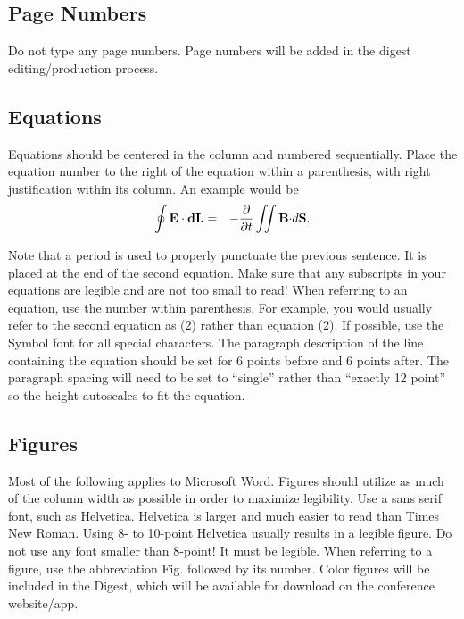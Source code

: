 \documentclass[]{IEEEtran}
\begin{document}
\subsection{Page Numbers }
Do not type any page numbers. Page numbers will be added in the digest editing/production process.
\subsection{Equations}
Equations should be centered in the column and numbered sequentially. Place the equation number to the right of the equation within a parenthesis, with right justification within its column. An example would be
\begin{eqnarray}
\oint {\bf E \cdot dL} & = & - {\partial\over \partial t}
\int\!\!\!\int {\bf B \cdot} d {\bf S}.
\end{eqnarray}

Note that a period is used to properly punctuate the previous
sentence. It is placed at the end of the second equation. Make sure
that any subscripts in your equations are legible and are not too
small to read! When referring to an equation, use the number within
parenthesis. For example, you would usually refer to the second
equation as (2) rather than equation (2). If possible, use the Symbol
font for all special characters.
The paragraph description of the line containing the
equation should be set for 6 points before and 6 points after. The
paragraph spacing will need to be set to ``single'' rather than ``exactly
12 point'' so the height autoscales to fit the equation.

\subsection{Figures}
Most of the following applies to Microsoft Word.  Figures should utilize as much of the column width as possible in order to maximize legibility. Use a sans serif font, such as Helvetica. Helvetica is larger and much easier to read than Times New Roman. Using 8- to 10-point Helvetica usually results in a legible figure. Do not use any font smaller than 8-point! It must be legible. When referring to a figure, use the abbreviation Fig. followed by its number. Color figures will be included in the Digest, which will be available for download on the conference website/app.  
\end{document}
